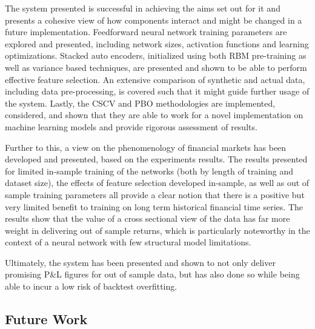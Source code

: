 \documentclass[a4paper,11pt,oneside]{article}
\theoremstyle{plain}
\theoremstyle{definition}
\begin{document}
The system presented is successful in achieving the aims set out for it and presents a cohesive view of how components interact and might be changed in a future implementation. Feedforward neural network training parameters are explored and presented, including network sizes, activation functions and learning optimizations. Stacked auto encoders, initialized using both RBM pre-training as well as variance based techniques, are presented and shown to be able to perform effective feature selection. An extensive comparison of synthetic and actual data, including data pre-processing, is covered such that it might guide further usage of the system. Lastly, the CSCV and PBO methodologies are implemented, considered, and shown that they are able to work for a novel implementation on machine learning models and provide rigorous assessment of results. \newline 

Further to this, a view on the phenomenology of financial markets has been developed and presented, based on the experiments results. The results presented for limited in-sample training of the networks (both by length of training and dataset size), the effects of feature selection developed in-sample, as well as out of sample training parameters all provide a clear notion that there is a positive but very limited benefit to training on long term historical financial time series. The results show that the value of a cross sectional view of the data has far more weight in delivering out of sample returns, which is particularly noteworthy in the context of a neural network with few structural model limitations. \newline 

Ultimately, the system has been presented and shown to not only deliver promising P\&L figures for out of sample data, but has also done so while being able to incur a low risk of backtest overfitting.

\subsection{Future Work}
\end{document}
